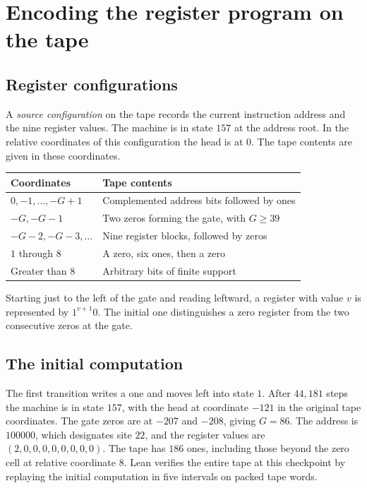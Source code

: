 \documentclass[11pt,letterpaper]{article}
\begin{document}
\section{Encoding the register program on the tape}\label{sec:layout}

\subsection{Register configurations}

A \emph{source configuration} on the tape records the current
instruction address and the nine register values. The machine is
in state $157$ at the address root. In the relative coordinates
of this configuration the head is at $0$. The tape contents are given
in these coordinates.
\begin{center}
\begin{tabular}{@{}ll@{}}
\toprule
Coordinates & Tape contents \\
\midrule
$0,-1,\ldots,-G+1$ & Complemented address bits followed by ones \\
$-G,-G-1$ & Two zeros forming the gate, with $G\geq39$ \\
$-G-2,-G-3,\ldots$ & Nine register blocks, followed by zeros \\
$1$ through $8$ & A zero, six ones, then a zero \\
Greater than $8$ & Arbitrary bits of finite support \\
\bottomrule
\end{tabular}
\end{center}
Starting just to the left of the gate and reading leftward, a
register with value $v$ is represented by $1^{v+1}0$. The initial
one distinguishes a zero register from the two consecutive zeros
at the gate.

\subsection{The initial computation}

The first transition writes a one and moves left into state $1$.
After $44{,}181$ steps the machine is in state $157$, with the head
at coordinate $-121$ in the original tape coordinates. The gate
zeros are at $-207$ and $-208$, giving $G=86$. The address is
$100000$, which designates site $22$, and the register values are
$(2,0,0,0,0,0,0,0,0)$. The tape has $186$ ones, including those
beyond the zero cell at relative coordinate $8$. Lean verifies the
entire tape at this checkpoint by replaying the initial computation
in five intervals on packed tape words.
\end{document}
